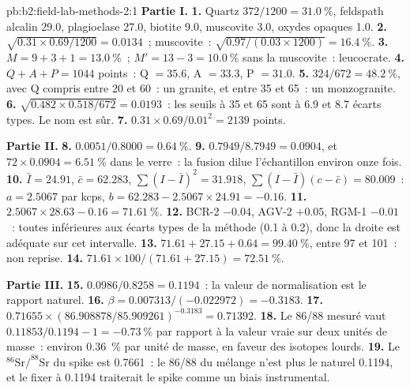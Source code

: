 \begin{solution}{pb:b2:field-lab-methods-2:1}
\noindent\textbf{Partie I.}
\textbf{1.} Quartz $372/1200 = \qty{31.0}{\percent}$, feldspath alcalin 29.0, plagioclase 27.0, biotite
9.0, muscovite 3.0, oxydes opaques 1.0.
\textbf{2.} $\sqrt{0.31 \times 0.69/1200} = 0.0134$~; muscovite~: $\sqrt{0.97/(0.03 \times 1200)} =
\qty{16.4}{\percent}$.
\textbf{3.} $M = 9 + 3 + 1 = \qty{13.0}{\percent}$~; $M' = 13 - 3 = \qty{10.0}{\percent}$ sans la
muscovite~: leucocrate.
\textbf{4.} $Q + A + P = 1044$ points~: Q $= 35.6$, A $= 33.3$, P $= 31.0$.
\textbf{5.} $324/672 = \qty{48.2}{\percent}$, avec Q compris entre 20 et 60~: un granite, et entre 35 et
65~: un monzogranite.
\textbf{6.} $\sqrt{0.482 \times 0.518/672} = 0.0193$~: les seuils à 35 et 65 sont à 6.9 et 8.7
écarts types. Le nom est sûr.
\textbf{7.} $0.31 \times 0.69/0.01^2 = 2139$ points.

\noindent\textbf{Partie II.}
\textbf{8.} $0.0051/0.8000 = \qty{0.64}{\percent}$.
\textbf{9.} $0.7949/8.7949 = 0.0904$, et $72 \times 0.0904 = \qty{6.51}{\percent}$  dans le
verre~: la fusion dilue l'échantillon environ onze fois.
\textbf{10.} $\bar I = 24.91$, $\bar c = 62.283$, $\sum(I - \bar I)^2 = 31.918$, $\sum(I - \bar I)(c -
\bar c) = 80.009$~: $a = 2.5067$ par kcps, $b = 62.283 - 2.5067 \times 24.91 = -0.16$.
\textbf{11.} $2.5067 \times 28.63 - 0.16 = \qty{71.61}{\percent}$.
\textbf{12.} BCR-2 $-0.04$, AGV-2 $+0.05$, RGM-1 $-0.01$~: toutes inférieures aux écarts types
de la méthode (0.1 à 0.2), donc la droite est adéquate sur cet intervalle.
\textbf{13.} $71.61 + 27.15 + 0.64 = \qty{99.40}{\percent}$, entre 97 et 101~: non reprise.
\textbf{14.} $71.61 \times 100/(71.61 + 27.15) = \qty{72.51}{\percent}$.

\noindent\textbf{Partie III.}
\textbf{15.} $0.0986/0.8258 = 0.1194$~: la valeur de normalisation est le rapport naturel.
\textbf{16.} $\beta = 0.007313/(-0.022972) = -0.3183$.
\textbf{17.} $0.71655 \times (86.908878/85.909261)^{-0.3183} = 0.71392$.
\textbf{18.} Le 86/88 mesuré vaut $0.11853/0.1194 - 1 = \qty{-0.73}{\percent}$ par rapport à la valeur vraie
sur deux unités de masse~: environ \qty{0.36}{\percent} par unité de masse, en faveur des isotopes lourds.
\textbf{19.} Le $^{86}\mathrm{Sr}/^{88}\mathrm{Sr}$ du spike est 0.7661~: le 86/88 du mélange n'est plus le
naturel 0.1194, et le fixer à 0.1194 traiterait le spike comme un biais instrumental.


\end{solution}
